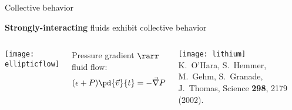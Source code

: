 \documentclass{beamer}
\begin{document}
\begin{frame}{Collective behavior}
  \vspace{.5em}

  \centering
  \textbf{Strongly-interacting} fluids exhibit collective behavior \\

  \vspace{1.5em}

  \begin{columns}%
    \texttt{[image: ellipticflow]} \\[1em]
    \footnotesize








    Pressure gradient $\rarr$ fluid flow:
    \begin{equation*}
      (\epsilon + P) \pd{\vec v}{t} = -\vec\nabla P
    \end{equation*}

    \texttt{[image: lithium]} \\[1ex]
    \raggedleft \tiny K.~O'Hara, S.~Hemmer, M.~Gehm, S.~Granade, J.~Thomas, Science \textbf{298}, 2179 (2002).
  \end{columns}


\end{frame}
\end{document}
